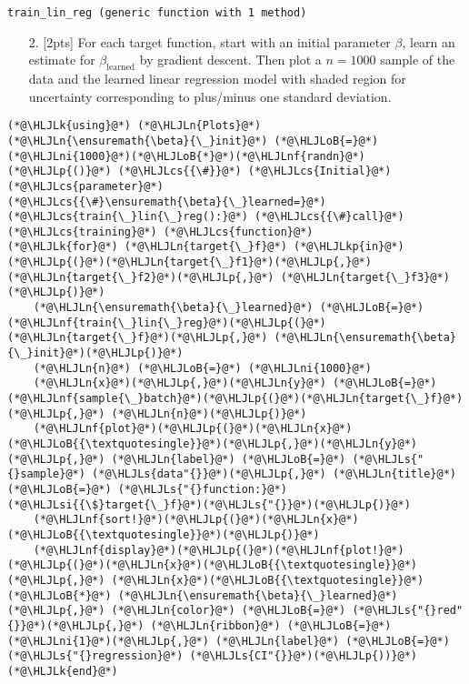 \documentclass[12pt,a4paper]{article}
\newcommand{\HLJLk}[1]{\textcolor[RGB]{148,91,176}{\textbf{#1}}}
\newcommand{\HLJLkp}[1]{\textcolor[RGB]{148,91,176}{\textbf{#1}}}
\newcommand{\HLJLn}[1]{#1}
\newcommand{\HLJLnf}[1]{\textcolor[RGB]{66,102,213}{#1}}
\newcommand{\HLJLs}[1]{\textcolor[RGB]{201,61,57}{#1}}
\newcommand{\HLJLsi}[1]{#1}
\newcommand{\HLJLni}[1]{\textcolor[RGB]{59,151,46}{#1}}
\newcommand{\HLJLoB}[1]{\textcolor[RGB]{102,102,102}{\textbf{#1}}}
\newcommand{\HLJLp}[1]{#1}
\newcommand{\HLJLcs}[1]{\textcolor[RGB]{153,153,119}{\textit{#1}}}
\begin{document}
\begin{lstlisting}
train_lin_reg (generic function with 1 method)
\end{lstlisting}


\begin{itemize}
\item[2. ] [2pts] For each target function, start with an initial parameter $\beta$,  learn an estimate for $\beta_\text{learned}$ by gradient descent.  Then plot a $n=1000$ sample of the data and the learned linear regression model with shaded region for uncertainty corresponding to plus/minus one standard deviation.

\end{itemize}

\begin{lstlisting}
(*@\HLJLk{using}@*) (*@\HLJLn{Plots}@*)
(*@\HLJLn{\ensuremath{\beta}{\_}init}@*) (*@\HLJLoB{=}@*) (*@\HLJLni{1000}@*)(*@\HLJLoB{*}@*)(*@\HLJLnf{randn}@*)(*@\HLJLp{()}@*) (*@\HLJLcs{{\#}}@*) (*@\HLJLcs{Initial}@*) (*@\HLJLcs{parameter}@*)
(*@\HLJLcs{{\#}\ensuremath{\beta}{\_}learned=}@*) (*@\HLJLcs{train{\_}lin{\_}reg():}@*) (*@\HLJLcs{{\#}call}@*) (*@\HLJLcs{training}@*) (*@\HLJLcs{function}@*)
(*@\HLJLk{for}@*) (*@\HLJLn{target{\_}f}@*) (*@\HLJLkp{in}@*) (*@\HLJLp{(}@*)(*@\HLJLn{target{\_}f1}@*)(*@\HLJLp{,}@*) (*@\HLJLn{target{\_}f2}@*)(*@\HLJLp{,}@*) (*@\HLJLn{target{\_}f3}@*)(*@\HLJLp{)}@*)
    (*@\HLJLn{\ensuremath{\beta}{\_}learned}@*) (*@\HLJLoB{=}@*) (*@\HLJLnf{train{\_}lin{\_}reg}@*)(*@\HLJLp{(}@*)(*@\HLJLn{target{\_}f}@*)(*@\HLJLp{,}@*) (*@\HLJLn{\ensuremath{\beta}{\_}init}@*)(*@\HLJLp{)}@*)
    (*@\HLJLn{n}@*) (*@\HLJLoB{=}@*) (*@\HLJLni{1000}@*)
    (*@\HLJLn{x}@*)(*@\HLJLp{,}@*)(*@\HLJLn{y}@*) (*@\HLJLoB{=}@*) (*@\HLJLnf{sample{\_}batch}@*)(*@\HLJLp{(}@*)(*@\HLJLn{target{\_}f}@*)(*@\HLJLp{,}@*) (*@\HLJLn{n}@*)(*@\HLJLp{)}@*)
    (*@\HLJLnf{plot}@*)(*@\HLJLp{(}@*)(*@\HLJLn{x}@*)(*@\HLJLoB{{\textquotesingle}}@*)(*@\HLJLp{,}@*)(*@\HLJLn{y}@*)(*@\HLJLp{,}@*) (*@\HLJLn{label}@*) (*@\HLJLoB{=}@*) (*@\HLJLs{"{}sample}@*) (*@\HLJLs{data"{}}@*)(*@\HLJLp{,}@*) (*@\HLJLn{title}@*) (*@\HLJLoB{=}@*) (*@\HLJLs{"{}function:}@*) (*@\HLJLsi{{\$}target{\_}f}@*)(*@\HLJLs{"{}}@*)(*@\HLJLp{)}@*)
    (*@\HLJLnf{sort!}@*)(*@\HLJLp{(}@*)(*@\HLJLn{x}@*)(*@\HLJLoB{{\textquotesingle}}@*)(*@\HLJLp{)}@*)
    (*@\HLJLnf{display}@*)(*@\HLJLp{(}@*)(*@\HLJLnf{plot!}@*)(*@\HLJLp{(}@*)(*@\HLJLn{x}@*)(*@\HLJLoB{{\textquotesingle}}@*)(*@\HLJLp{,}@*) (*@\HLJLn{x}@*)(*@\HLJLoB{{\textquotesingle}}@*) (*@\HLJLoB{*}@*) (*@\HLJLn{\ensuremath{\beta}{\_}learned}@*)(*@\HLJLp{,}@*) (*@\HLJLn{color}@*) (*@\HLJLoB{=}@*) (*@\HLJLs{"{}red"{}}@*)(*@\HLJLp{,}@*) (*@\HLJLn{ribbon}@*) (*@\HLJLoB{=}@*) (*@\HLJLni{1}@*)(*@\HLJLp{,}@*) (*@\HLJLn{label}@*) (*@\HLJLoB{=}@*) (*@\HLJLs{"{}regression}@*) (*@\HLJLs{CI"{}}@*)(*@\HLJLp{))}@*)
(*@\HLJLk{end}@*)
\end{lstlisting}
\end{document}
